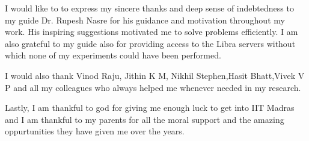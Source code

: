 \acknowledgements
\hspace{10mm}I would like to to express my sincere thanks and deep sense of indebtedness to
my guide Dr. Rupesh Nasre for his guidance and motivation throughout my
work. His inspiring suggestions motivated me to solve problems efficiently. I am
also grateful to my guide also for providing access to the Libra servers without which none of my experiments could have been performed.\par
 \par
I would also thank Vinod Raju, Jithin K M, Nikhil Stephen,Hasit Bhatt,Vivek V P and all my colleagues who always helped me whenever needed in my research. \par
Lastly, I am thankful to god for giving me enough luck to get into IIT Madras and I am thankful to my parents for all the moral support and the amazing
oppurtunities they have given me over the years.


